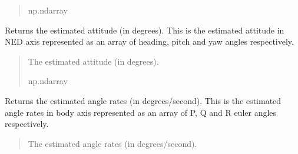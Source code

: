 \documentclass[letterpaper,10pt,english]{sphinxmanual}
\begin{document}
\begin{fulllineitems}
\begin{fulllineitems}
\begin{quote}
\begin{description}
\sphinxAtStartPar
np.ndarray

\end{description}\end{quote}

\end{fulllineitems}


\begin{fulllineitems}
\label{\detokenize{modules/estimation/state:qnav.estimation.state.EstimatedState.attitude}}
\pysigstartsignatures
{}
\pysigstopsignatures
\sphinxAtStartPar
Returns the estimated attitude (in degrees).
This is the estimated attitude in NED axis represented as an array
of heading, pitch and yaw angles respectively.
\begin{quote}\begin{description}
\sphinxAtStartPar
The estimated attitude (in degrees).

\sphinxAtStartPar
np.ndarray

\end{description}\end{quote}

\end{fulllineitems}


\begin{fulllineitems}
\label{\detokenize{modules/estimation/state:qnav.estimation.state.EstimatedState.angle_rates}}
\pysigstartsignatures
{}
\pysigstopsignatures
\sphinxAtStartPar
Returns the estimated angle rates (in degrees/second).
This is the estimated angle rates in body axis represented as an
array of P, Q and R euler angles respectively.
\begin{quote}\begin{description}
\sphinxAtStartPar
The estimated angle rates (in degrees/second).


\end{description}
\end{quote}
\end{fulllineitems}
\end{fulllineitems}
\end{document}

